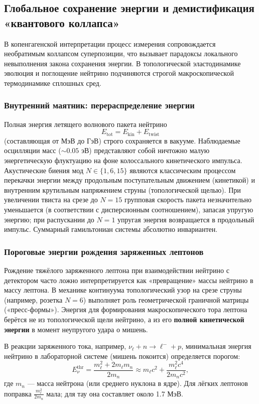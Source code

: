 \documentclass[11pt,a4paper]{article}
\begin{document}
	\subsection{Глобальное сохранение энергии и демистификация «квантового коллапса»}
	
	В копенгагенской интерпретации процесс измерения сопровождается необратимым коллапсом суперпозиции, что вызывает парадоксы локального невыполнения закона сохранения энергии. В топологической эластодинамике эволюция и поглощение нейтрино подчиняются строгой макроскопической термодинамике сплошных сред.
	
	\subsubsection{Внутренний маятник: перераспределение энергии}
	
	Полная энергия летящего волнового пакета нейтрино
	\[
	E_{\text{tot}} = E_{\text{kin}} + E_{\text{twist}}
	\]
	(составляющая от МэВ до ГэВ) строго сохраняется в вакууме. Наблюдаемые осцилляции масс ($\sim 0.05$ эВ) представляют собой ничтожно малую энергетическую флуктуацию на фоне колоссального кинетического импульса. Акустические биения мод $N \in \{1, 6, 15\}$ являются классическим процессом перекачки энергии между продольным поступательным движением (кинетикой) и внутренним крутильным напряжением струны (топологической щелью). При увеличении твиста на срезе до $N=15$ групповая скорость пакета незначительно уменьшается (в соответствии с дисперсионным соотношением), запасая упругую энергию; при распускании до $N=1$ упругая энергия возвращается в продольный импульс. Суммарный гамильтониан системы абсолютно инвариантен.
	
	\subsubsection{Пороговые энергии рождения заряженных лептонов}
	
	Рождение тяжёлого заряженного лептона при взаимодействии нейтрино с детектором часто ложно интерпретируется как «превращение» массы нейтрино в массу лептона. В механике континуума топологический узор на срезе струны (например, розетка $N=6$) выполняет роль геометрической граничной матрицы («пресс-формы»). Энергия для формирования макроскопического тора лептона берётся не из топологической щели нейтрино, а из его \textbf{полной кинетической энергии} в момент неупругого удара о мишень.
	
	В реакции заряженного тока, например, $\nu_\ell + n \to \ell^- + p$, минимальная энергия нейтрино в лабораторной системе (мишень покоится) определяется порогом:
	\[
	E_{\nu}^{\text{thr}} = \frac{m_\ell^2 + 2 m_\ell m_n}{2 m_n} \approx m_\ell c^2 + \frac{m_\ell^2 c^4}{2 m_n c^2},
	\]
	где $m_n$ — масса нейтрона (или среднего нуклона в ядре). Для лёгких лептонов поправка $\frac{m_\ell^2}{2m_n}$ мала; для тау она составляет около 1.7 МэВ.
	
\end{document}
